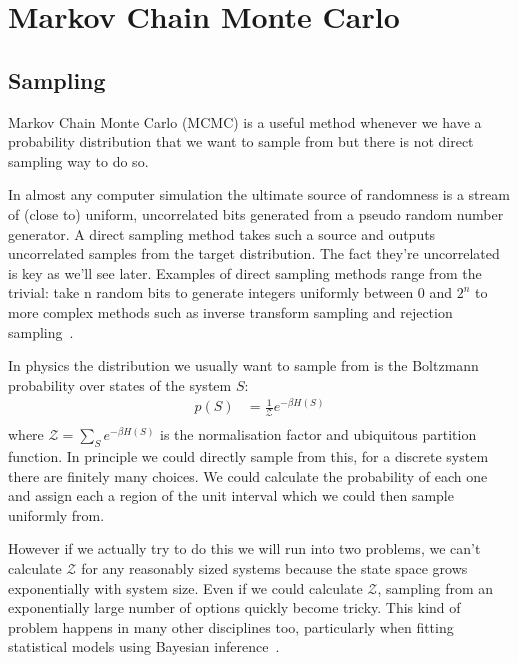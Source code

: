 \hypertarget{markov-chain-monte-carlo}{%
\section{Markov Chain Monte Carlo}\label{markov-chain-monte-carlo}}

\hypertarget{sampling}{%
\subsection{Sampling}\label{sampling}}

Markov Chain Monte Carlo (MCMC) is a useful method whenever we have a probability distribution that we want to sample from but there is not direct sampling way to do so.

In almost any computer simulation the ultimate source of randomness is a stream of (close to) uniform, uncorrelated bits generated from a pseudo random number generator. A direct sampling method takes such a source and outputs uncorrelated samples from the target distribution. The fact they're uncorrelated is key as we'll see later. Examples of direct sampling methods range from the trivial: take n random bits to generate integers uniformly between 0 and \(2^n\) to more complex methods such as inverse transform sampling and rejection sampling~\autocite{devroyeRandomSampling1986}.

In physics the distribution we usually want to sample from is the Boltzmann probability over states of the system \(S\): \[
\begin{aligned}
p(S)  &= \frac{1}{\mathcal{Z}} e^{-\beta H(S)} \\
\end{aligned}
\] where \(\mathcal{Z} = \sum_S e^{-\beta H(S)}\) is the normalisation factor and ubiquitous partition function. In principle we could directly sample from this, for a discrete system there are finitely many choices. We could calculate the probability of each one and assign each a region of the unit interval which we could then sample uniformly from.

However if we actually try to do this we will run into two problems, we can't calculate \(\mathcal{Z}\) for any reasonably sized systems because the state space grows exponentially with system size. Even if we could calculate \(\mathcal{Z}\), sampling from an exponentially large number of options quickly become tricky. This kind of problem happens in many other disciplines too, particularly when fitting statistical models using Bayesian inference~\autocite{BMCP2021}.

